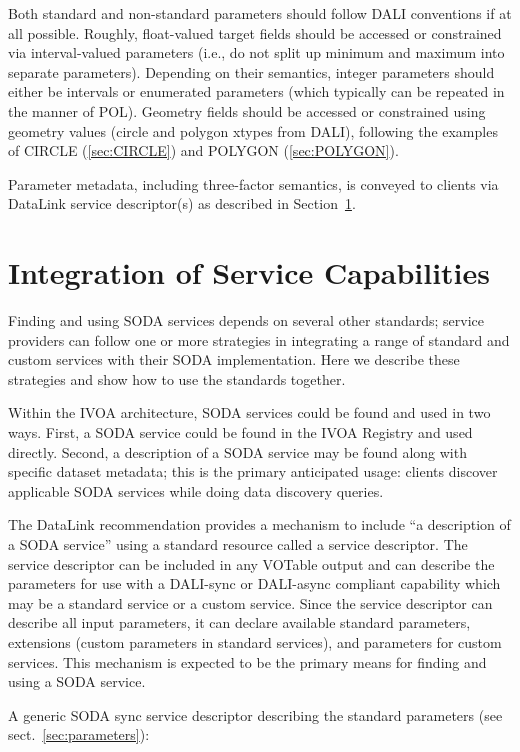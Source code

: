 \documentclass[11pt,a4paper]{ivoa}
\begin{document}
Both standard and non-standard parameters should follow DALI conventions
if at all possible.  Roughly, float-valued target fields should be accessed or
constrained via interval-valued parameters (i.e., do not split up
minimum and maximum into separate parameters).  Depending on their
semantics, integer parameters should either be intervals or enumerated
parameters (which typically can be repeated in the manner of POL). 
Geometry fields should be
accessed or constrained using geometry values (circle and polygon xtypes
from DALI), following the examples of CIRCLE
(\ref{sec:CIRCLE}) and POLYGON (\ref{sec:POLYGON}).

Parameter metadata, including three-factor semantics, is conveyed to
clients via DataLink service descriptor(s) as
described in Section~\ref{sec:integration}.

\section{Integration of Service Capabilities}
\label{sec:integration}

Finding and using SODA services depends on several other standards;
service providers can follow one or more strategies in integrating a
range of standard and custom services with their SODA implementation.
Here we describe these strategies and show how to use the standards
together.

Within the IVOA architecture, SODA services could be found and used in two
ways. First, a SODA service could be found in the IVOA Registry and used
directly. Second, a description of a SODA service may be found along
with specific dataset metadata; this is the primary anticipated usage:
clients discover applicable SODA services while doing data discovery
queries.

The DataLink recommendation provides a mechanism
to include ``a description of a SODA service'' using a standard resource
called a service descriptor. The service descriptor can be included in any
VOTable \citep{2013ivoa.spec.0920O} output and can describe the parameters for
use with a DALI-sync or DALI-async compliant capability which may be a standard
 service or a custom service. Since the service descriptor can describe all input parameters,
it can declare available standard parameters, extensions (custom
parameters in standard services), and parameters for custom services.
This mechanism is expected to be the primary means for finding and using
a SODA service. 

A generic SODA sync service descriptor describing the standard
parameters (see sect.~\ref{sec:parameters}):
\end{document}

